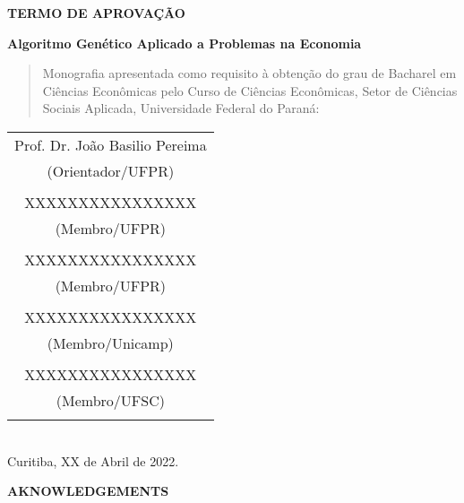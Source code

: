 \documentclass[a4paper,12pt,openright,oneside]{book}
\begin{document}
\newpage
\begin{center}
{\Large \textbf{TERMO DE APROVAÇÃO}}

\vspace{1cm}
{\Large \textbf{Algoritmo Genético Aplicado a Problemas na Economia}}

\vspace{1cm}
\begin{quotation}
\noindent Monografia apresentada como requisito à obtenção do grau de Bacharel em Ciências Econômicas pelo Curso de Ciências Econômicas, Setor de Ciências Sociais Aplicada, Universidade Federal do Paraná:
\end{quotation}

\vspace{1cm}
\begin{tabular}{c}
\hline
Prof. Dr. João Basilio Pereima \\
(Orientador/UFPR)   \\
\vspace{25pt}  \\
\hline
XXXXXXXXXXXXXXXX \\
(Membro/UFPR)\\
\vspace{25pt}   \\
\hline
XXXXXXXXXXXXXXXX \\
(Membro/UFPR)\\
\vspace{25pt}   \\
\hline
XXXXXXXXXXXXXXXX \\
(Membro/Unicamp)\\
\vspace{25pt}   \\
\hline
XXXXXXXXXXXXXXXX \\
(Membro/UFSC)\\
\vspace{25pt} \\
\end{tabular}
\vspace{40pt} \\
Curitiba, XX de Abril de 2022.   
\end{center}




\newpage
\begin{center}
{\Large\textbf{AKNOWLEDGEMENTS}}
\end{center}
\vspace{2cm}
\end{document}
